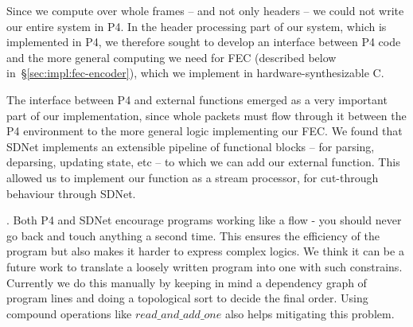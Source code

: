 %
%

         
Since we compute over whole frames -- and not only headers -- we could
not write our entire system in P4. In the header processing part of
our system, which is implemented in P4, we therefore sought to develop
an interface between P4 code and the more general computing we need
for FEC (described below in~\S\ref{sec:impl:fec-encoder}), which we
implement in hardware-synthesizable C.

The interface between P4 and external functions emerged as a very
important part of our implementation, since whole packets must flow
through it between the P4 environment to the more general logic
implementing our FEC. We found that SDNet implements an extensible
pipeline of functional blocks -- for parsing, deparsing, updating
state, etc -- to which we can add our external function. This allowed us to implement our function as a stream processor, for cut-through behaviour through SDNet.

. Both P4 and SDNet encourage programs working like a flow - you should never go back and touch anything
a second time. This ensures the efficiency of the program but also makes it harder to express complex
logics. We think it can be a future work to translate a loosely written program into one with such constrains.
Currently we do this manually by keeping in mind a dependency graph of program lines and doing a topological sort
to decide the final order. Using compound operations like
$read\_and\_add\_one$ also helps mitigating this problem.

